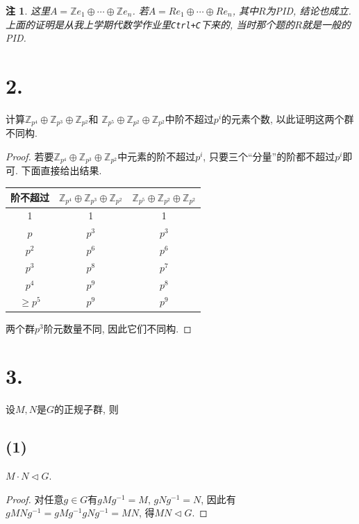 \documentclass[12pt, a4paper, fontset=windows]{ctexart}
\newcommand{\Z}{\mathbb{Z}}
\newcommand{\yh}[1]{“{#1}”} %
\newtheorem*{remark}{注}
\begin{document}
\begin{remark}
这里$A=\Z e_1\oplus\cdots\oplus\Z e_n$. 
若$A=Re_1\oplus\cdots\oplus Re_n$, 其中$R$为PID, 结论也成立. 
上面的证明是从我上学期代数学作业里{\tt Ctrl+C}下来的, 当时那个题的$R$就是一般的PID. 
\end{remark}

\section*{2.}
\label{ord-count}

计算$\Z_{p^4}\oplus\Z_{p^3}\oplus\Z_{p^2}$和
$\Z_{p^5}\oplus\Z_{p^2}\oplus\Z_{p^2}$中阶不超过$p^i$的元素个数, 
以此证明这两个群不同构. 

\begin{proof}
若要$\Z_{p^4}\oplus\Z_{p^3}\oplus\Z_{p^2}$中元素的阶不超过$p^i$, 
只要三个\yh{分量}的阶都不超过$p^i$即可. 下面直接给出结果. 

\vspace{1em}

\begin{center}\begin{tabular}{c|c c}
阶不超过 & $\Z_{p^4}\oplus\Z_{p^3}\oplus\Z_{p^2}$ & $\Z_{p^5}\oplus\Z_{p^2}\oplus\Z_{p^2}$\\
\hline
1 & 1 & 1\\
$p$ & $p^3$ & $p^3$\\
$p^2$ & $p^6$ & $p^6$\\
$p^3$ & $p^8$ & $p^7$\\
$p^4$ & $p^9$ & $p^8$\\
$\ge p^5$ & $p^9$ & $p^9$
\end{tabular}\end{center}

\vspace{1em}

两个群$p^3$阶元数量不同, 因此它们不同构. 
\end{proof}

\section*{3.}

设$M,N$是$G$的正规子群, 则

\subsection*{(1)}

$M\cdot N\lhd G$. 

\begin{proof}
对任意$g\in G$有$gMg^{-1}=M$, $gNg^{-1}=N$, 因此有
$gMNg^{-1}=gMg^{-1}gNg^{-1}=MN$, 得$MN\lhd G$. 
\end{proof}
\end{document}
